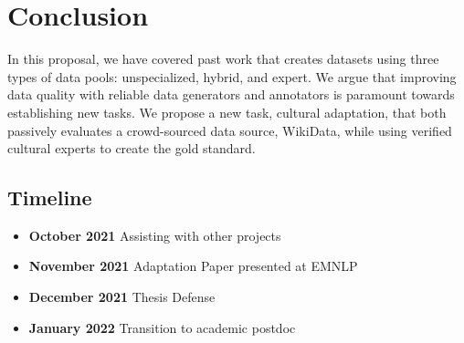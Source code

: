 \chapter{Conclusion}
\label{ch:conclusion}

In this proposal, we have covered past work that creates datasets using three types of data pools: unspecialized, hybrid, and expert.  
%
We argue that improving data quality with reliable data generators and annotators is paramount towards establishing new \nlp{} tasks.
%
We propose a new task, cultural adaptation, that both passively evaluates a crowd-sourced data source, WikiData, while using verified cultural experts to create the gold standard.  

\section{Timeline}
\label{sec:timeline}

\begin{itemize}
  \item \textbf{October 2021} Assisting with other projects 
  \item \textbf{November 2021} Adaptation Paper presented at EMNLP
  \item \textbf{December 2021} Thesis Defense
  \item \textbf{January 2022} Transition to academic postdoc
\end{itemize}

